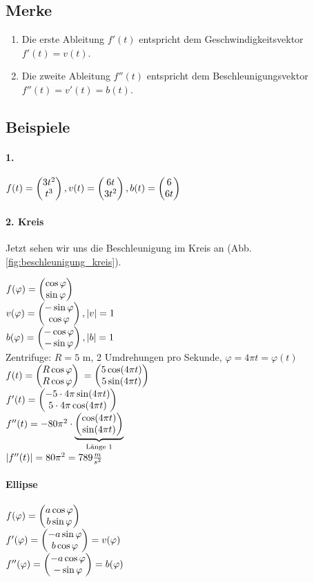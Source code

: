 \subsection{Merke}
\begin{enumerate}
\item Die erste Ableitung $f'(t)$ entspricht dem Geschwindigkeitsvektor $f'(t) = v(t)$.
\item Die zweite Ableitung $f''(t)$ entspricht dem Beschleunigungsvektor $f''(t)= v'(t)=b(t)$.
\end{enumerate}

\subsection{Beispiele}
\paragraph{1.} 
$ f(t)=  \begin{pmatrix}  3t^2\\t^3 \end{pmatrix} , v(t)= \begin{pmatrix}  6t\\3t^2  \end{pmatrix} , b(t)= \begin{pmatrix}  6\\ 6t \end{pmatrix} $
\paragraph{2. Kreis} 
Jetzt sehen wir uns die Beschleunigung im Kreis an (Abb. \ref{fig:beschleunigung_kreis}).

$f(\varphi) =  \begin{pmatrix}  \cos \varphi\\ \sin \varphi  \end{pmatrix} $\\
$v(\varphi) =  \begin{pmatrix}  -\sin \varphi\\ \cos \varphi  \end{pmatrix} ,  \left\vert v \right\vert =1 $\\
$b(\varphi)=  \begin{pmatrix}  -\cos \varphi\\ -\sin \varphi  \end{pmatrix} ,  \left\vert b \right\vert =1$\\
Zentrifuge: $R=5$ m, 2 Umdrehungen pro Sekunde, $\varphi=4\pi t = \varphi(t)$\\
$f(t)= \begin{pmatrix}  R\cos \varphi\\ R\cos \varphi  \end{pmatrix}  $
$=  \begin{pmatrix}  5 \cos(4\pi t)\\ 5 \sin(4\pi t) \end{pmatrix} $\\
$f'(t) =  \begin{pmatrix}  -5\cdot 4\pi \sin(4\pi t)\\ 5\cdot 4 \pi \cos(4\pi t)  \end{pmatrix} $\\
$f''(t) = -80\pi^2 \cdot \underbrace{ \begin{pmatrix}  \cos(4\pi t)\\ \sin(4\pi t)  \end{pmatrix} }_{\textrm{Länge 1}}$\\
$ \left\vert f''(t) \right\vert =80\pi^2 = 789 \frac{m}{s^2}$
\paragraph{Ellipse}
$ f(\varphi)= \begin{pmatrix}  a \cos \varphi \\ b \sin \varphi  \end{pmatrix} $\\
$ f'(\varphi)=  \begin{pmatrix}  -a \sin \varphi\\ b \cos \varphi \end{pmatrix} =v(\varphi)$\\
$ f''(\varphi)=  \begin{pmatrix}  -a \cos \varphi\\ - \sin \varphi \end{pmatrix} =b(\varphi)$

